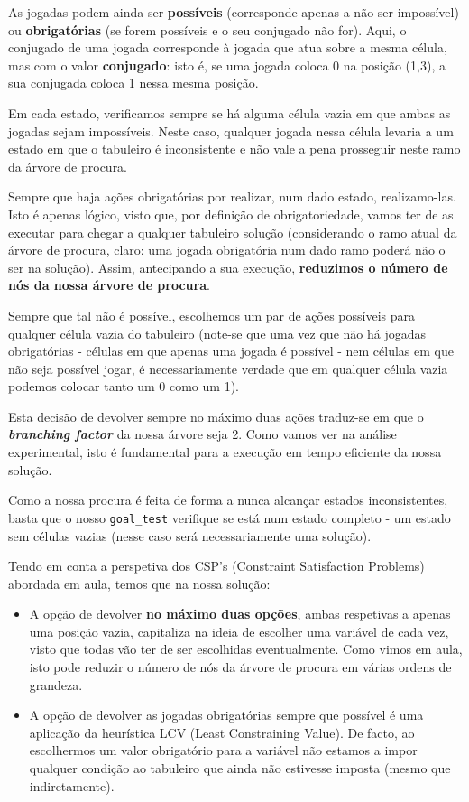 \documentclass[12pt,a4paper]{article}
\begin{document}
As jogadas podem ainda ser \textbf{possíveis} (corresponde apenas a não ser impossível)
ou \textbf{obrigatórias} (se forem possíveis e o seu conjugado não for).
Aqui, o conjugado de uma jogada corresponde à jogada que atua sobre a mesma célula,
mas com o valor \textbf{conjugado}: isto é, se uma jogada coloca 0 na posição (1,3),
a sua conjugada coloca 1 nessa mesma posição.

Em cada estado, verificamos sempre se há alguma célula vazia em que ambas as jogadas
sejam impossíveis.
Neste caso, qualquer jogada nessa célula levaria a um estado em que o tabuleiro é
inconsistente e não vale a pena prosseguir neste ramo da árvore de procura.

Sempre que haja ações obrigatórias por realizar, num dado estado, realizamo-las.
Isto é apenas lógico, visto que, por definição de obrigatoriedade, vamos ter de
as executar para chegar a qualquer tabuleiro solução (considerando o ramo
atual da árvore de procura, claro: uma jogada obrigatória num dado ramo poderá
não o ser na solução).
Assim, antecipando a sua execução, \textbf{reduzimos o número de nós da nossa árvore de procura}.

Sempre que tal não é possível, escolhemos um par de ações possíveis para qualquer
célula vazia do tabuleiro (note-se que uma vez que não há jogadas obrigatórias -
células em que apenas uma jogada é possível - nem células em que não seja possível jogar,
é necessariamente verdade que em qualquer célula vazia podemos colocar tanto um 0 como um 1).

Esta decisão de devolver sempre no máximo duas ações traduz-se em que o \textbf{\textit{branching factor}}
da nossa árvore seja 2.
Como vamos ver na análise experimental, isto é fundamental para a execução em tempo
eficiente da nossa solução.

Como a nossa procura é feita de forma a nunca alcançar estados inconsistentes, basta
que o nosso \texttt{goal\_test} verifique se está num estado completo - um estado
sem células vazias (nesse caso será necessariamente uma solução).

Tendo em conta a perspetiva dos CSP's (Constraint Satisfaction Problems) abordada em aula,
temos que na nossa solução:
\begin{itemize}
      \item A opção de devolver \textbf{no máximo duas opções}, ambas respetivas a apenas uma
            posição vazia, capitaliza na ideia de escolher uma variável de cada vez, visto
            que todas vão ter de ser escolhidas eventualmente.
            Como vimos em aula, isto pode reduzir o número de nós da árvore de procura
            em várias ordens de grandeza.
      \item A opção de devolver as jogadas obrigatórias sempre que possível é uma
            aplicação da heurística LCV (Least Constraining Value).
            De facto, ao escolhermos um valor obrigatório para a variável não estamos
            a impor qualquer condição ao tabuleiro que ainda não estivesse imposta
            (mesmo que indiretamente).
\end{itemize}
\end{document}

